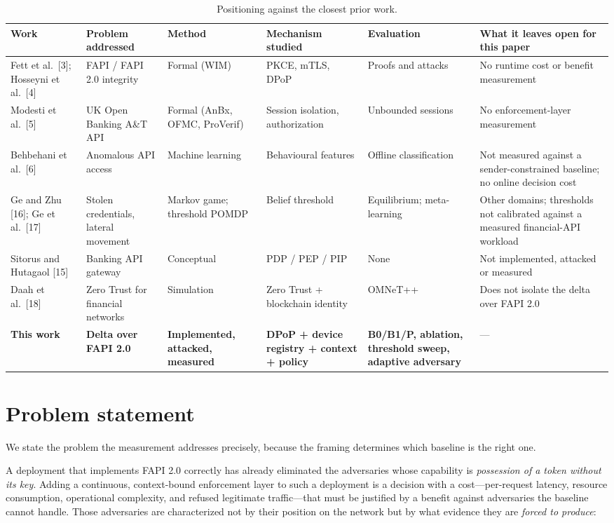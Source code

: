 \setcounter{table}{0}
\begin{table}[t]
\centering
\caption{Positioning against the closest prior work.}
\label{tab:1}
\footnotesize
\begin{tabular}{p{2.0cm}p{2.1cm}p{2.0cm}p{2.3cm}p{2.3cm}p{4.2cm}}
\toprule
Work & Problem addressed & Method & Mechanism studied & Evaluation & What it leaves open for this paper \\
\midrule
Fett et al.\ [3]; Hosseyni et al.\ [4] & FAPI / FAPI 2.0 integrity & Formal (WIM) & PKCE, mTLS, DPoP & Proofs and attacks & No runtime cost or benefit measurement \\
Modesti et al.\ [5] & UK Open Banking A\&T API & Formal (AnBx, OFMC, ProVerif) & Session isolation, authorization & Unbounded sessions & No enforcement-layer measurement \\
Behbehani et al.\ [6] & Anomalous API access & Machine learning & Behavioural features & Offline classification & Not measured against a sender-constrained baseline; no online decision cost \\
Ge and Zhu [16]; Ge et al.\ [17] & Stolen credentials, lateral movement & Markov game; threshold POMDP & Belief threshold & Equilibrium; meta-learning & Other domains; thresholds not calibrated against a measured financial-API workload \\
Sitorus and Hutagaol [15] & Banking API gateway & Conceptual & PDP / PEP / PIP & None & Not implemented, attacked or measured \\
Daah et al.\ [18] & Zero Trust for financial networks & Simulation & Zero Trust + blockchain identity & OMNeT++ & Does not isolate the delta over FAPI 2.0 \\
\textbf{This work} & \textbf{Delta over FAPI 2.0} & \textbf{Implemented, attacked, measured} & \textbf{DPoP + device registry + context + policy} & \textbf{B0/B1/P, ablation, threshold sweep, adaptive adversary} & --- \\
\bottomrule
\end{tabular}
\end{table}

\section{Problem statement}
\label{sec:problem}

We state the problem the measurement addresses precisely, because the framing determines which baseline is the right one.

A deployment that implements FAPI 2.0 correctly has already eliminated the adversaries whose capability is \textit{possession of a token without its key}. Adding a continuous, context-bound enforcement layer to such a deployment is a decision with a cost---per-request latency, resource consumption, operational complexity, and refused legitimate traffic---that must be justified by a benefit against adversaries the baseline cannot handle. Those adversaries are characterized not by their position on the network but by what evidence they are \textit{forced to produce}:

